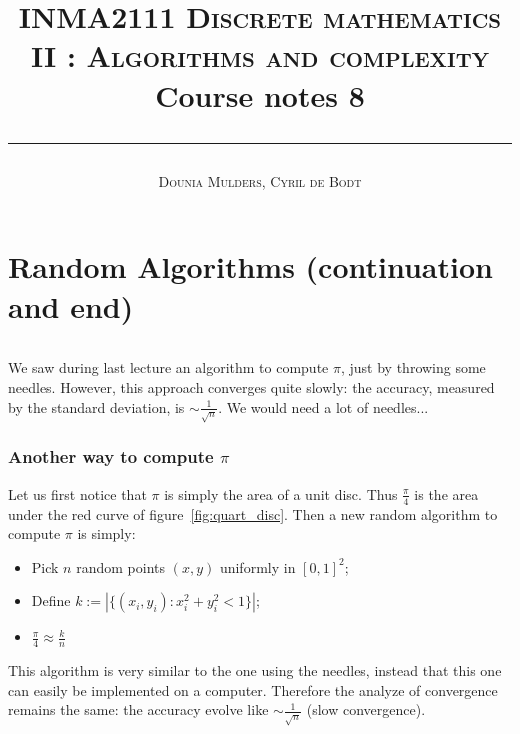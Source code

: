 \documentclass[11pt,a4paper]{scrartcl} %
\title{\textsc{ \normalsize INMA2111 Discrete mathematics II : Algorithms and complexity} \\ Course notes 8 \vspace{0.5cm} \hrule height 1pt}
\author{\textsc{\small Dounia Mulders, Cyril de Bodt}}
\theoremstyle{definition}
\begin{document}
\maketitle

\part*{Random Algorithms (continuation and end)}
\paragraph{}

We saw during last lecture an algorithm to compute $\pi$, just by throwing some needles. However, this approach converges quite slowly: the accuracy, measured by the standard deviation, is $\sim \frac{1}{\sqrt{n}}$. We would need a lot of needles...

\section{Another way to compute $\pi$}

Let us first notice that $\pi$ is simply the area of a unit disc. Thus $\frac{\pi}{4}$ is the area under the red curve of figure~\ref{fig:quart_disc}. Then a new random algorithm to compute $\pi$ is simply:
\begin{itemize}
	\item Pick $n$ random points $(x,y)$ uniformly in $[0,1]^2$;
	\item Define $k:=|\{(x_i,y_i):x_i^2+y_i^2<1\}|$;
	\item $\frac{\pi}{4}\approx \frac{k}{n}$
\end{itemize}

This algorithm is very similar to the one using the needles, instead that this one can easily be implemented on a computer. Therefore the analyze of convergence remains the same: the accuracy evolve like $\sim \frac{1}{\sqrt{n}}$ (slow convergence).
\end{document}
